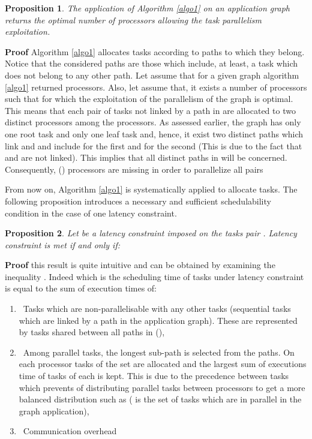 \documentclass{ijcaArticle}
\newtheorem{Proposition}{Proposition}
\begin{document}
\begin{Proposition}\label{gamma} 
The application of Algorithm \ref{algo1} on an application graph returns the optimal number of processors allowing the task parallelism exploitation. 
\end{Proposition}
\vskip2mm 
\textbf{Proof}
Algorithm \ref{algo1} allocates tasks according to paths to which they belong.  Notice that the considered paths are those which include, at least, a task which does not
belong to any other path.
Let assume that for a given graph  algorithm \ref{algo1} returned  processors. Also, let assume that, it exists a number of processors  such that  for which the exploitation of the parallelism of the graph  is optimal.  
This means that each pair of tasks  not linked by a path in  are allocated to two distinct  processors among the  processors. As assessed earlier, the graph  has only one root task  and only one leaf task  and, hence, it exist two distinct paths which link  and  and include  for the first and  for the second (This is due to the fact that  and  are not linked). This implies that all distinct paths in  will be concerned.  Consequently, () processors are missing in order to parallelize all pairs  



From now on, Algorithm \ref{algo1} is systematically applied to allocate tasks. 
The following proposition introduces a necessary and sufficient schedulability condition in the case of one latency constraint.
\vskip2mm
\begin{Proposition}\label{clus_sim_n_cond_2} 
 Let  be a latency constraint imposed on the tasks pair . Latency constraint   is met if and only if:  \ \ 
 
\end{Proposition}
\vskip2mm
\textbf{Proof} 
this result is quite intuitive and can be obtained by examining the inequality . Indeed  which is the scheduling time of tasks under latency constraint  is equal to the sum of execution times of:
\begin{enumerate}
\item \ Tasks which are  non-parallelisable with any other tasks (sequential tasks which are linked by a path in the application graph). These are represented by tasks shared between all paths in  (), 
\item \ Among parallel tasks, the longest sub-path is selected from the  paths. On each processor  tasks of the set   are allocated and the
largest sum of executions time of tasks of each   is kept. This is due to the precedence between tasks which prevents of distributing parallel tasks between processors to get a more balanced distribution such as  ( is the set of tasks which are in parallel in the graph application), 
\item \ Communication overhead 
\end{enumerate} 
        
\end{document}
